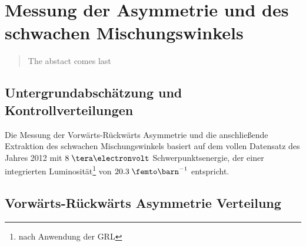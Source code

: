 


\chapter{Messung der Asymmetrie und des schwachen Mischungswinkels}
\label{afb}

\begin{quote}
    The abstact comes last
\end{quote}



\section{Untergrundabschätzung und Kontrollverteilungen}
\label{afb:kinematics}





Die Messung der Vorwärts-Rückwärts Asymmetrie und die anschließende Extraktion
des schwachen Mischungswinkels basiert auf dem vollen Datensatz des Jahres
2012 mit $8\TeV$ Schwerpunktsenergie, der einer integrierten
Luminosität\footnote{nach Anwendung der \ac{GRL}} von $20.3\fb^{-1}$
entspricht.





\section{Vorwärts-Rückwärts Asymmetrie Verteilung}
\label{afb:afb}

